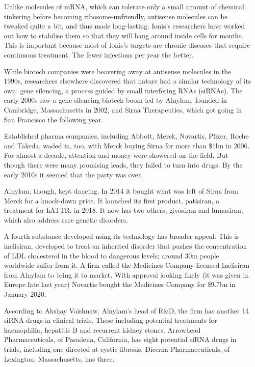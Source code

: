 \documentclass{article}
\begin{document}
Unlike molecules of mRNA, which can tolerate only a small amount of chemical tinkering before becoming ribosome-unfriendly, antisense molecules can be tweaked quite a bit, and thus made long-lasting. Ionis's researchers have worked out how to stabilise them so that they will hang around inside cells for months. This is important because most of Ionis's targets are chronic diseases that require continuous treatment. The fewer injections per year the better. 

While biotech companies were beavering away at antisense molecules in the 1990s, researchers elsewhere discovered that nature had a similar technology of its own: gene silencing, a process guided by small interfering RNAs (siRNAs). The early 2000s saw a gene-silencing biotech boom led by Alnylam, founded in Cambridge, Massachusetts in 2002, and Sirna Therapeutics, which got going in San Francisco the following year. 

Established pharma companies, including Abbott, Merck, Novartis, Pfizer, Roche and Takeda, waded in, too, with Merck buying Sirna for more than \$1bn in 2006. For almost a decade, attention and money were showered on the field. But though there were many promising leads, they failed to turn into drugs. By the early 2010s it seemed that the party was over. 

Alnylam, though, kept dancing. In 2014 it bought what was left of Sirna from Merck for a knock-down price. It launched its first product, patisiran, a treatment for hATTR, in 2018. It now has two others, givosiran and lumasiran, which also address rare genetic disorders. 

A fourth substance developed using its technology has broader appeal. This is inclisiran, developed to treat an inherited disorder that pushes the concentration of LDL cholesterol in the blood to dangerous levels; around 30m people worldwide suffer from it. A firm called the Medicines Company licensed Inclisiran from Alnylam to bring it to market. With approval looking likely (it was given in Europe late last year) Novartis bought the Medicines Company for \$9.7bn in January 2020. 

According to Akshay Vaishnaw, Alnylam's head of R\&D, the firm has another 14 siRNA drugs in clinical trials. These including potential treatments for haemophilia, hepatitis B and recurrent kidney stones. Arrowhead Pharmaceuticals, of Pasadena, California, has eight potential siRNA drugs in trials, including one directed at cystic fibrosis. Dicerna Pharmaceuticals, of Lexington, Massachusetts, has three. 
\end{document}
